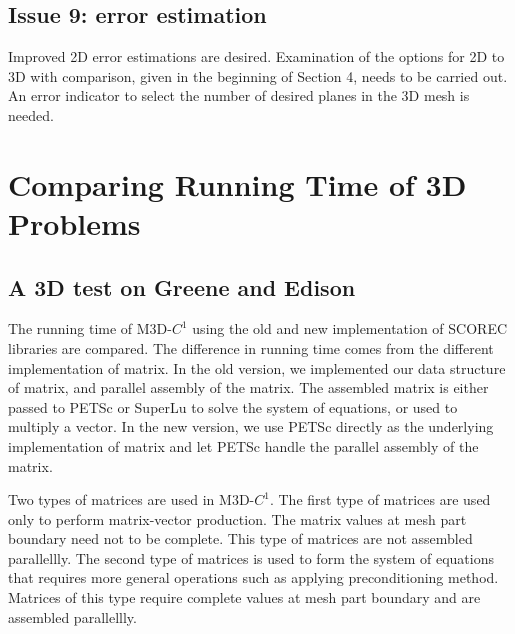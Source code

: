 \documentclass[11pt]{article}  %
\begin{document}
\subsection{Issue 9: error estimation}
Improved 2D error estimations are desired. Examination of the options for 2D to 3D with comparison, given in the beginning of Section 4, needs to be carried out. An error indicator to select the number of desired planes in the 3D mesh is needed.

\section{Comparing Running Time of 3D Problems} \label{sec:issues}
\subsection{A 3D test on Greene and Edison}
The running time of M3D-$C^1$ using the old and new implementation of SCOREC libraries are compared. The difference in running time comes from the different implementation of matrix. In the old version, we implemented our data structure of matrix, and parallel assembly of the matrix. The assembled matrix is either passed to PETSc or SuperLu to solve the system of equations, or used to multiply a vector.  In the new version, we use PETSc directly as the underlying implementation of matrix and let PETSc handle the parallel assembly of the matrix.

Two types of matrices are used in M3D-$C^1$. The first type of matrices are used only to perform matrix-vector production.  The matrix values at mesh part boundary need not to be complete. This type of matrices are not assembled parallellly. The second type of matrices is used to form the system of equations that requires more general operations such as applying preconditioning method.   Matrices of this type require complete values at mesh part boundary and are assembled parallellly.
\end{document}
